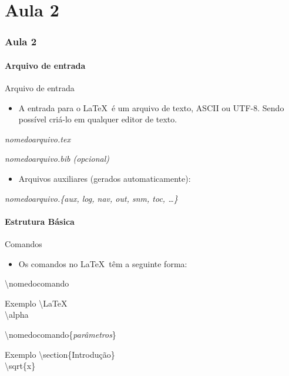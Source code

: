 
\part{Aula 2}
\section{Aula 2}

\subsection{Arquivo de entrada}

\begin{frame}{Arquivo de entrada}
	\begin{itemize}
	\item A entrada para o \LaTeX\ é um arquivo de texto, ASCII ou UTF-8. Sendo possível criá-lo em qualquer editor de texto.
	\end{itemize}
	
	\alert{\it nomedoarquivo.tex}

    \pause

    {\it nomedoarquivo.bib (opcional) }

	\vspace{.5cm}
	\pause

	\begin{itemize}
	\item Arquivos auxiliares (gerados automaticamente):
	\end{itemize}
	
	{\it nomedoarquivo.\{aux, log, nav, out, snm, toc, \dots\} }
\end{frame}

\subsection{Estrutura Básica}

\begin{frame}{Comandos}
	\begin{itemize}
	\item Os comandos no \LaTeX\ têm a seguinte forma:
	\end{itemize}

	\alert{\textbackslash nomedocomando}

	\begin{exampleblock}{Exemplo}
		\textbackslash LaTeX \\ \textbackslash alpha
	\end{exampleblock}
	
	\vspace{.5cm}

	\alert{\textbackslash nomedocomando\{\textit{parâmetros}\} }

	\begin{exampleblock}{Exemplo}
		\textbackslash section\{Introdução\} \\ \textbackslash sqrt\{x\}
	\end{exampleblock}
\end{frame}

